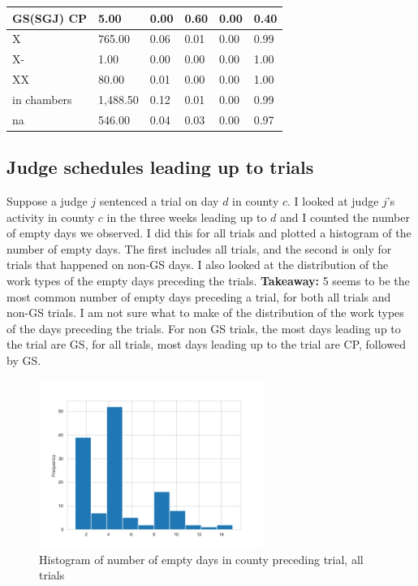 \documentclass[11pt]{article}
\begin{document}
\begin{table}[H]
\begin{tabular}{|l|l|l|l|l|l|}
      GS(SGJ) CP  & 5.00     & 0.00 & 0.60 & 0.00 & 0.40 \\ \hline
      X           & 765.00   & 0.06 & 0.01 & 0.00 & 0.99 \\ \hline
      X-          & 1.00     & 0.00 & 0.00 & 0.00 & 1.00 \\ \hline
      XX          & 80.00    & 0.01 & 0.00 & 0.00 & 1.00 \\ \hline
      in chambers & 1,488.50 & 0.12 & 0.01 & 0.00 & 0.99 \\ \hline
      na          & 546.00   & 0.04 & 0.03 & 0.00 & 0.97 \\ \hline
      \end{tabular}
    \end{table}

  \subsection{Judge schedules leading up to trials}
    Suppose a judge $j$ sentenced a trial on day $d$ in county $c$. I looked at
    judge $j$'s activity in county $c$ in the three weeks leading up to $d$ and I counted the
    number of empty days we observed. I did this for all trials and plotted a histogram of the number
    of empty days. The first includes all trials, and the second is only for trials that happened on
    non-GS days. I also looked at the distribution of the work types of the empty days preceding the trials. \textbf{Takeaway:} 5 seems to be the most common number of empty days preceding a trial, for both all trials and non-GS trials. I am not sure what to make of the distribution of the work types of the days preceding the trials. For non GS trials, the most days leading up to the trial are GS, for all trials, most days leading up to the trial are CP, followed by GS.

    \begin{figure}[H]
      \centering
      \caption{Histogram of number of empty days in county preceding trial, all trials}
      \includegraphics[width=0.65\textwidth]{../../../output/figures/Exploration/empty_days_hist_All.png}
    \end{figure}
\end{document}
